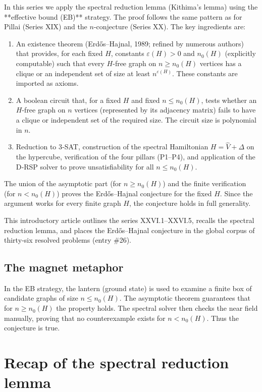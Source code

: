 \documentclass[11pt,a4paper]{article}
\begin{document}
In this series we apply the spectral reduction lemma (Kithima's lemma) using the **effective bound (EB)** strategy. The proof follows the same pattern as for Pillai (Series XIX) and the $n$-conjecture (Series XX). The key ingredients are:
\begin{enumerate}
\item An existence theorem (Erdős–Hajnal, 1989; refined by numerous authors) that provides, for each fixed $H$, constants $\varepsilon(H)>0$ and $n_0(H)$ (explicitly computable) such that every $H$-free graph on $n\ge n_0(H)$ vertices has a clique or an independent set of size at least $n^{\varepsilon(H)}$. These constants are imported as axioms.
\item A boolean circuit that, for a fixed $H$ and fixed $n\le n_0(H)$, tests whether an $H$-free graph on $n$ vertices (represented by its adjacency matrix) fails to have a clique or independent set of the required size. The circuit size is polynomial in $n$.
\item Reduction to 3‑SAT, construction of the spectral Hamiltonian $H = \hat{V} + \Delta$ on the hypercube, verification of the four pillars (P1–P4), and application of the D‑RSP solver to prove unsatisfiability for all $n\le n_0(H)$.
\end{enumerate}
The union of the asymptotic part (for $n\ge n_0(H)$) and the finite verification (for $n < n_0(H)$) proves the Erdős–Hajnal conjecture for the fixed $H$. Since the argument works for every finite graph $H$, the conjecture holds in full generality.

This introductory article outlines the series XXVI.1–XXVI.5, recalls the spectral reduction lemma, and places the Erdős–Hajnal conjecture in the global corpus of thirty‑six resolved problems (entry \#26).

\subsection*{The magnet metaphor}

In the EB strategy, the lantern (ground state) is used to examine a finite box of candidate graphs of size $n\le n_0(H)$. The asymptotic theorem guarantees that for $n\ge n_0(H)$ the property holds. The spectral solver then checks the near field manually, proving that no counterexample exists for $n < n_0(H)$. Thus the conjecture is true.

\section{Recap of the spectral reduction lemma}
\end{document}
